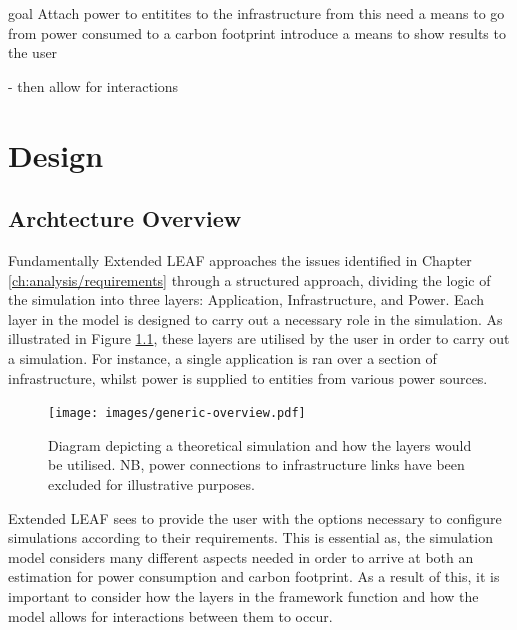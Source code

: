 \documentclass{l4proj}
\begin{document}
goal Attach power to entitites to the infrastructure
from this need a means to go from power consumed to a carbon footprint
introduce a means to show results to the user

- then allow for interactions
\chapter{Design}\label{ch:design}



\section{Archtecture Overview}\label{sec:architecture-overview}
Fundamentally Extended LEAF approaches the issues identified in Chapter \ref{ch:analysis/requirements} through a structured approach, dividing the logic of the simulation into three layers: Application, Infrastructure, and Power.
Each layer in the model is designed to carry out a necessary role in the simulation.
As illustrated in Figure \ref{fig:generic-overview}, these layers are utilised by the user in order to carry out a simulation.
For instance, a single application is ran over a section of infrastructure, whilst power is supplied to entities from various power sources.

\begin{figure}[htbp]
    \centering
    \texttt{[image: images/generic-overview.pdf]}
    ~
    \caption{Diagram depicting a theoretical simulation and how the layers would be utilised. NB, power connections to infrastructure links have been excluded for illustrative purposes.}
    \label{fig:generic-overview}
\end{figure}

Extended LEAF sees to provide the user with the options necessary to configure simulations according to their requirements.
This is essential as, the simulation model considers many different aspects needed in order to arrive at both an estimation for power consumption and carbon footprint.
As a result of this, it is important to consider how the layers in the framework function and how the model allows for interactions between them to occur.
\end{document}
